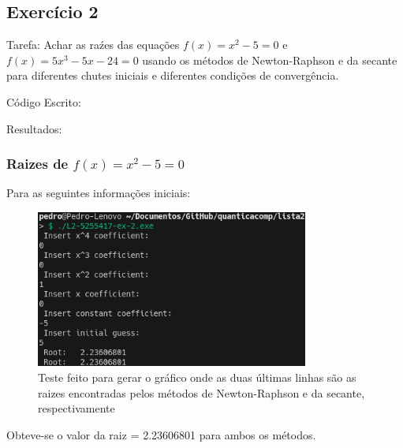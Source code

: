 \documentclass[12pt, a4paper]{article} %
\begin{document}
%        


       

    \subsection{Exerc\'icio 2}

        Tarefa: Achar as ra\'zes das equa\c{c}\~oes $f(x) = x^2 - 5 = 0$ e $f(x) = 5x^3 - 5x - 24 = 0$ usando os m\'etodos de Newton-Raphson e da secante para diferentes chutes iniciais e diferentes condi\c{c}\~oes de converg\^encia.

        C\'odigo Escrito:
        

        Resultados:

        \subsubsection{Raizes de $f(x) = x^2 - 5 = 0$}

            Para as seguintes informa\c{c}\~oes iniciais:
            \begin{figure}[H]
                \centering
                \includegraphics[width=0.8\textwidth]{../images/results-ex-2-5.png}
                \caption{Teste feito para gerar o gr\'afico onde as duas \'ultimas linhas s\~ao as raizes encontradas pelos m\'etodos de Newton-Raphson e da secante, respectivamente}
            \end{figure}
            Obteve-se o valor da raiz = 2.23606801 para ambos os m\'etodos.
\end{document}
